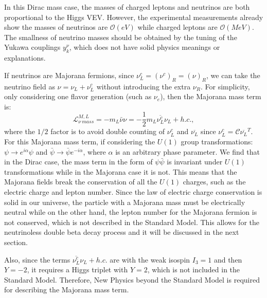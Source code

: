 In this Dirac mass case, the masses of charged leptons and neutrinos are both proportional to the Higgs VEV. However, the experimental measurements already show the masses of neutrinos are $\mathcal O(eV)$ 
while charged leptons are $\mathcal O(MeV)$. The smallness of neutrino masses should be obtained by the tuning of the Yukawa couplings $y_k^\nu$, which does not have solid physics meanings or explanations.

If neutrinos are Majorana fermions, since $\nu_L^c=(\nu^c)_R=(\nu)_R$, we can take the neutrino field as $\nu=\nu_L+\nu_L^c$ without introducing the extra $\nu_R$. For simplicity, only considering one flavor generation (such as $\nu_e$), then the Majorana mass term is:  
\begin{equation}\label{major_mass}
\mathcal{L}^{M,L}_{\nu~mass} = -m_L\bar{\nu}\nu=-\frac{1}{2}m_L\overline{\nu_L^c}\nu_L+h.c.,
\end{equation}
where the $1/2$ factor is to avoid double counting of $\nu_L^c$ and $\overline{\nu_L}$ since $\nu_L^c=\mathcal{C}\overline{\nu_L}^T$\cite{giunti2007fundamentals}. For this Majorana mass term, if considering the $U(1)$ group transformations: $\psi\to e^{i\alpha}\psi$ and $\bar \psi \to \bar\psi e^{-i\alpha}$, where $\alpha$ is an arbitrary phase parameter. We find that in the Dirac case, the mass term in the form of $\psi\bar\psi$ is invariant under $U(1)$ transformations while in the Majorana case it is not. This means that the Majorana fields break the conservation of all the $U(1)$ charges, such as the electric charge and lepton number\cite{akhmedov2014majorana}. Since the law of electric charge conservation is solid in our universe, the particle with a Majorana mass must be electrically neutral while on the other hand, the lepton number for the Majorana fermion is not conserved, which is not described in the Standard Model. This allows for the neutrinoless double beta decay process and it will be discussed in the next section.

Also, since the terms $\overline{\nu_L^c}\nu_L+h.c.$ are with the weak isospin $I_3=1$ and then $Y=-2$, it requires a Higgs triplet with $Y=2$, which is not included in the Standard Model\cite{funchal2013physics}. Therefore, New Physics beyond the Standard Model is required for describing the Majorana mass term.

